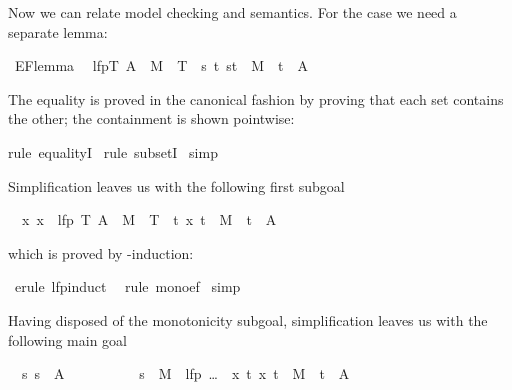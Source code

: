 \begin{isabellebody}
\begin{isamarkuptext}
Now we can relate model checking and semantics. For the  case we need
a separate lemma:%
\end{isamarkuptext}%
\ EF{\isacharunderscore}lemma{\isacharcolon}\isanewline
\ \ {\isachardoublequote}lfp{\isacharparenleft}{\isasymlambda}T{\isachardot}\ A\ {\isasymunion}\ M{\isacharcircum}{\isacharminus}{}\ {\isacharcircum}{\isacharcircum}\ T{\isacharparenright}\ {\isacharequal}\ {\isacharbraceleft}s{\isachardot}\ {\isasymexists}t{\isachardot}\ {\isacharparenleft}s{\isacharcomma}t{\isacharparenright}\ {\isasymin}\ M{\isacharcircum}{\isacharasterisk}\ {\isasymand}\ t\ {\isasymin}\ A{\isacharbraceright}{\isachardoublequote}%
\begin{isamarkuptxt}%
\noindent
The equality is proved in the canonical fashion by proving that each set
contains the other; the containment is shown pointwise:%
\end{isamarkuptxt}%
rule\ equalityI{\isacharparenright}\isanewline
\ rule\ subsetI{\isacharparenright}\isanewline
\ simp{\isacharparenright}%
\begin{isamarkuptxt}%
\noindent
Simplification leaves us with the following first subgoal
\begin{isabelle}%
\ {}{\isachardot}\ {\isasymAnd}x{\isachardot}\ x\ {\isasymin}\ lfp\ {\isacharparenleft}{\isasymlambda}T{\isachardot}\ A\ {\isasymunion}\ M{\isacharcircum}{\isacharminus}{}\ {\isacharcircum}{\isacharcircum}\ T{\isacharparenright}\ {\isasymLongrightarrow}\ {\isasymexists}t{\isachardot}\ {\isacharparenleft}x{\isacharcomma}\ t{\isacharparenright}\ {\isasymin}\ M\isactrlsup {\isacharasterisk}\ {\isasymand}\ t\ {\isasymin}\ A%
\end{isabelle}
which is proved by -induction:%
\end{isamarkuptxt}%
\ erule\ lfp{\isacharunderscore}induct{\isacharparenright}\isanewline
\ \ rule\ mono{\isacharunderscore}ef{\isacharparenright}\isanewline
\ simp{\isacharparenright}%
\begin{isamarkuptxt}%
\noindent
Having disposed of the monotonicity subgoal,
simplification leaves us with the following main goal
\begin{isabelle}
\ \ {\isasymAnd}s{\isachardot}\ s\ {\isasymin}\ A\ {\isasymor}\isanewline
\ \ \ \ \ \ \ \ \ s\ {\isasymin}\ M{\isacharcircum}{\isacharminus}\ {\isacharcircum}{\isacharcircum}\ {\isacharparenleft}lfp\ {\isacharparenleft}{\dots}{\isacharparenright}\ {\isasyminter}\ {\isacharbraceleft}x{\isachardot}\ {\isasymexists}t{\isachardot}\ {\isacharparenleft}x{\isacharcomma}\ t{\isacharparenright}\ {\isasymin}\ M{\isacharcircum}{\isacharasterisk}\ {\isasymand}\ t\ {\isasymin}\ A{\isacharbraceright}{\isacharparenright}\isanewline

\end{isabelle}
\end{isamarkuptxt}
\end{isabellebody}
